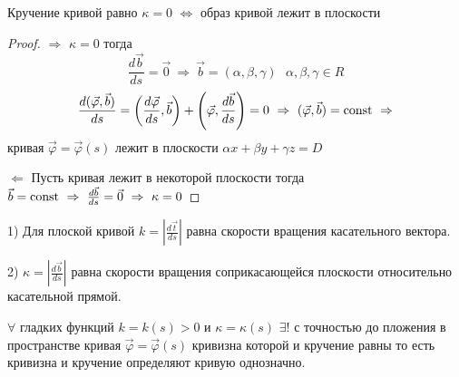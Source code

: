 \begin{theorem}
  Кручение кривой равно $\kappa = 0$ $\Leftrightarrow$ образ кривой лежит в
  плоскости
\end{theorem}

\begin{proof}
  $\Rightarrow$ $\kappa = 0$ тогда
  $$
  \frac{d\vec b}{ds} = \vec 0 ~ \Rightarrow ~ \vec b = (\alpha, \beta, \gamma)
  ~~~ \alpha, \beta, \gamma \in R
  $$
  $$
  \frac{d(\vec \varphi, \vec b)}{ds} = \left(\frac{d \vec \varphi}{ds},
  \vec b \right) + \left( \vec \varphi, \frac{d\vec b}{ds} \right) = 0 ~
  \Rightarrow ~ (\vec \varphi, \vec b) = \mathrm{const} ~ \Rightarrow
  $$
  кривая $\vec \varphi = \vec \varphi (s)$ лежит в плоскости $\alpha x +
  \beta y + \gamma z = D$

  $\Leftarrow$ Пусть кривая лежит в некоторой плоскости тогда
  $\vec b = \mathrm{const} ~ \Rightarrow ~ \frac{d \vec b}{ds} = \vec 0 ~ \Rightarrow ~
  \kappa = 0$
\end{proof}

\begin{block}
  1) Для плоской кривой $k = \left|\frac{d \vec t}{ds}\right|$ равна
  скорости вращения касательного вектора.

  2) $\kappa = \left|\frac{d\vec b}{ds}\right|$ равна скорости вращения
  соприкасающейся плоскости относительно касательной прямой.
\end{block}

\begin{theorem}
  $\forall$ гладких функций $k = k(s) > 0$ и $\kappa = \kappa(s)$ $\exists!$
  с точностью до пложения в пространстве кривая
  $\vec \varphi = \vec \varphi(s)$ кривизна которой и кручение равны то есть
  кривизна и кручение определяют кривую однозначно.
\end{theorem}